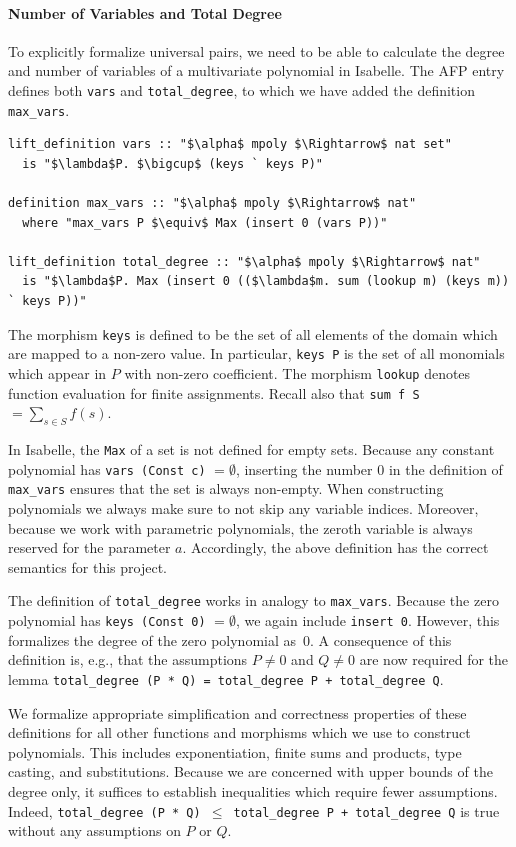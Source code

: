 \documentclass[a4paper,USenglish,cleveref,autoref,thm-restate]{lipics-v2021}
\begin{document}
\paragraph*{Number of Variables and Total Degree}
To explicitly formalize universal pairs, we need to be able to calculate the degree and number of variables of a multivariate polynomial in Isabelle. The AFP entry~\cite{polynomials-afp} defines both \texttt{vars} and \texttt{total\_degree}, to which we have added the definition \texttt{max\_vars}.
\begin{lstlisting}
lift_definition vars :: "$\alpha$ mpoly $\Rightarrow$ nat set"
  is "$\lambda$P. $\bigcup$ (keys ` keys P)"

definition max_vars :: "$\alpha$ mpoly $\Rightarrow$ nat"
  where "max_vars P $\equiv$ Max (insert 0 (vars P))"

lift_definition total_degree :: "$\alpha$ mpoly $\Rightarrow$ nat"
  is "$\lambda$P. Max (insert 0 (($\lambda$m. sum (lookup m) (keys m)) ` keys P))"
\end{lstlisting}
The morphism \texttt{keys} is defined to be the set of all elements of the domain which are mapped to a non-zero value. In particular, \texttt{keys P} is the set of all monomials which appear in $P$ with non-zero coefficient. The morphism \texttt{lookup} denotes function evaluation for finite assignments. Recall also that \texttt{sum f S} $= \sum_{s\in S} f(s)$.

In Isabelle, the \texttt{Max} of a set is not defined for empty sets. Because any constant polynomial has \texttt{vars (Const c)} $= \emptyset$, inserting the number $0$ in the definition of \texttt{max\_vars} ensures that the set is always non-empty. When constructing polynomials we always make sure to not skip any variable indices. Moreover, because we work with parametric polynomials, the zeroth variable is always reserved for the parameter $a$. Accordingly, the above definition has the correct semantics for this project.

The definition of \texttt{total\_degree} works in analogy to \texttt{max\_vars}. Because the zero polynomial has \texttt{keys (Const 0)} $= \emptyset$, we again include \texttt{insert 0}. However, this formalizes the degree of the zero polynomial as~$0$. A consequence of this definition is, e.g., that the assumptions $P \neq 0$ and $Q \neq 0$ are now required for the lemma \texttt{total\_degree (P * Q) = total\_degree P + total\_degree Q}.

\medskip

We formalize appropriate simplification and correctness properties of these definitions for all other functions and morphisms which we use to construct polynomials. This includes exponentiation, finite sums and products, type casting, and substitutions. Because we are concerned with upper bounds of the degree only, it suffices to establish inequalities which require fewer assumptions. Indeed, \texttt{total\_degree (P * Q) $\leq$ total\_degree P + total\_degree Q} is true without any assumptions on $P$ or $Q$.
\end{document}
